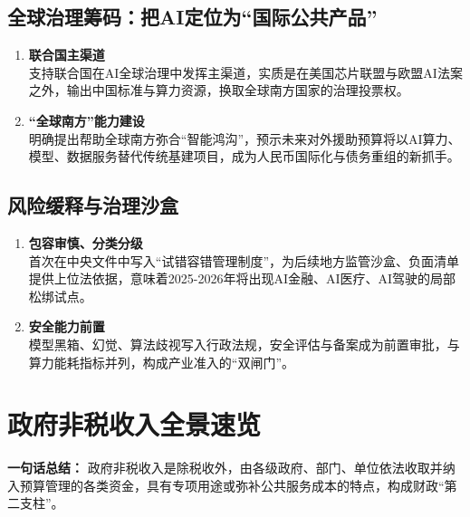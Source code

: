 \subsection{全球治理筹码：把AI定位为“国际公共产品”}
\begin{enumerate}[leftmargin=*, nosep]
    \item \textbf{联合国主渠道}  \\
    支持联合国在AI全球治理中发挥主渠道，实质是在美国芯片联盟与欧盟AI法案之外，输出中国标准与算力资源，换取全球南方国家的治理投票权。  
    \item \textbf{“全球南方”能力建设  }\\
    明确提出帮助全球南方弥合“智能鸿沟”，预示未来对外援助预算将以AI算力、模型、数据服务替代传统基建项目，成为人民币国际化与债务重组的新抓手。
\end{enumerate}

\subsection{风险缓释与治理沙盒}
\begin{enumerate}[leftmargin=*, nosep]
    \item \textbf{包容审慎、分类分级}  \\
    首次在中央文件中写入“试错容错管理制度”，为后续地方监管沙盒、负面清单提供上位法依据，意味着2025-2026年将出现AI金融、AI医疗、AI驾驶的局部松绑试点。  
    \item \textbf{安全能力前置}  \\
    模型黑箱、幻觉、算法歧视写入行政法规，安全评估与备案成为前置审批，与算力能耗指标并列，构成产业准入的“双闸门”。
\end{enumerate}

\section{政府非税收入全景速览}
\textbf{一句话总结：}  
政府非税收入是除税收外，由各级政府、部门、单位依法收取并纳入预算管理的各类资金，具有专项用途或弥补公共服务成本的特点，构成财政“第二支柱”。

